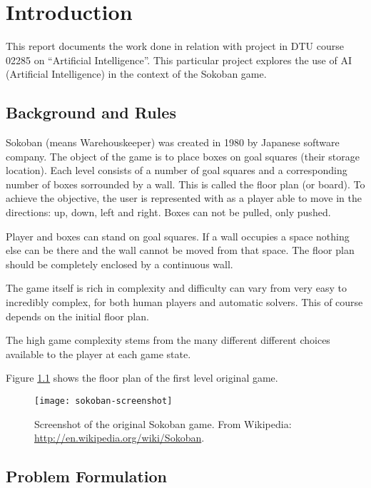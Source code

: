 \chapter{Introduction}

This report documents the work done in relation with project in DTU
course 02285 on ``Artificial Intelligence''.  This particular project
explores the use of AI (Artificial Intelligence) in the context of the
Sokoban game.

\section{Background and Rules}

Sokoban (means Warehouskeeper) was created in 1980 by Japanese
software company. The object of the game is to place boxes on goal
squares (their storage location).  Each level consists of a number of
goal squares and a corresponding number of boxes sorrounded by a
wall. This is called the floor plan (or board). To achieve the
objective, the user is represented with as a player able to move in
the directions: up, down, left and right. Boxes can not be pulled,
only pushed. \citep{cgw:sokoban}


Player and boxes can stand on goal squares. If a wall occupies a space
nothing else can be there and the wall cannot be moved from that
space.  The floor plan should be completely enclosed by a continuous
wall.

The game itself is rich in complexity and difficulty can vary from
very easy to incredibly complex, for both human players and automatic
solvers. This of course depends on the initial floor plan.

The high game complexity stems from the many different different
choices available to the player at each game state.

Figure \ref{fig:soko-org-screen} shows the floor plan of the first
level original game.

\begin{figure}
  \centering
  \texttt{[image: sokoban-screenshot]}
  \caption{Screenshot of the original Sokoban game. From Wikipedia:
    \url{http://en.wikipedia.org/wiki/Sokoban}.}
  \label{fig:soko-org-screen}
\end{figure}

\section{Problem Formulation}

